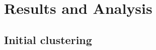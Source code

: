 \documentclass[11pt]{article}
\begin{document}
        \section{Results and Analysis}

            \subsection{Initial clustering}






                

\end{document}
